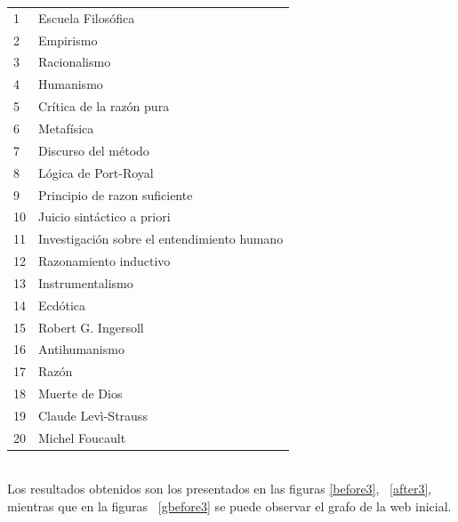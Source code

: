 \documentclass[a4paper]{article}
\begin{document}
\begin{tabular}{l l}
1 & Escuela Filosófica \\
2 & Empirismo \\
3 & Racionalismo \\
4 & Humanismo \\
5 & Crítica de la razón pura \\
6 & Metafísica \\
7 & Discurso del método \\
8 & Lógica de Port-Royal \\
9 & Principio de razon suficiente \\
10 & Juicio sintáctico a priori \\
11 & Investigación sobre el entendimiento humano \\
12 & Razonamiento inductivo \\
13 & Instrumentalismo \\
14 & Ecdótica \\
15 & Robert G. Ingersoll \\
16 & Antihumanismo \\
17 & Razón \\
18 & Muerte de Dios \\
19 & Claude Levì-Strauss \\
20 & Michel Foucault \\
\end{tabular}\\

Los resultados obtenidos son los presentados en las figuras \ref{before3}, ~\ref{after3}, mientras que en la figuras ~\ref{gbefore3} se puede observar el grafo de la web inicial.
\end{document}

